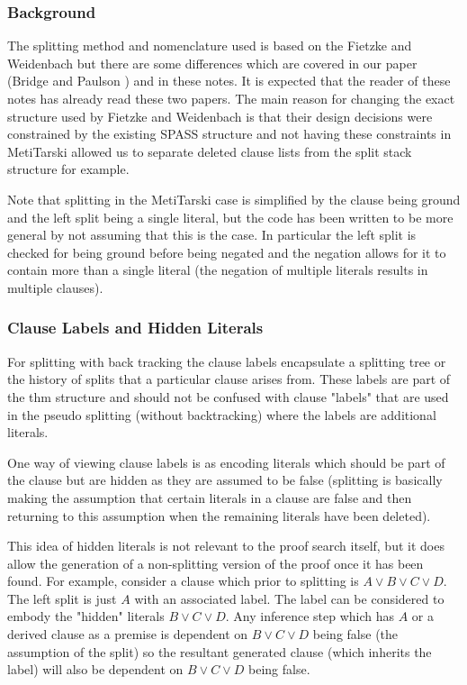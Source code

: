 \documentclass[11pt, oneside]{article}   	%
\begin{document}
\subsubsection{Background}
The splitting method and nomenclature used is based on the Fietzke and Weidenbach \cite{SPASS_Splitting} but there are some differences which are covered in our paper (Bridge and Paulson \cite{MT_Splitting}) and in these notes.
It is expected that the reader of these notes has already read these two papers. The main reason for changing the exact structure used by Fietzke and Weidenbach is that their design decisions were constrained by the existing SPASS structure and not having these constraints in MetiTarski allowed us to separate deleted clause lists from the split stack structure for example.

Note that splitting in the MetiTarski case is simplified by the clause being ground and the left split being a single literal, but the code has been written to be more general by not assuming that this is the case. In particular the left split is checked for being ground before being negated and the negation allows for it to contain more than a single literal (the negation of multiple literals results in multiple clauses).

\subsubsection{Clause Labels and Hidden Literals}
For splitting with back tracking the clause labels encapsulate a splitting tree or the history of splits that a particular clause arises from. These labels are part of the thm structure and should not be confused with clause "labels" that are used in the pseudo splitting (without backtracking) where the labels are additional literals.

One way of viewing clause labels is as encoding literals which should be part of the clause but are hidden as they are
assumed to be false (splitting is basically making the assumption that certain literals in a clause are false and then returning to this assumption when the remaining literals have been deleted).

This idea of hidden literals is not relevant to the proof search itself, but it does allow the generation of a non-splitting version of the proof once it has been found. 
For example, consider a clause which prior to splitting is
$A \vee B \vee C \vee D$.
The left split is just
$A$ with an associated label. The label can be considered to embody the "hidden" literals $B \vee C \vee D$. Any inference step which has $A$ or a derived clause as a premise is dependent on
$B \vee C \vee D$ being false (the assumption of the split) so the resultant generated clause (which inherits the label) will also be dependent on $B \vee C \vee D$ being false.
\end{document}
